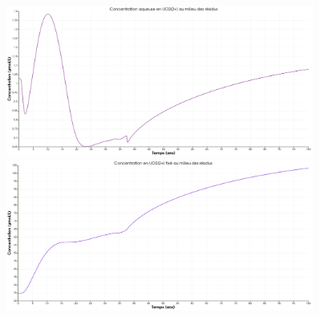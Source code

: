 \documentclass{article}
\begin{document}
\begin{figure}[H]
    \centering
    \begin{minipage}{0.5\textwidth}
        \centering
        \includegraphics[width=0.9\textwidth]{III_B_2_18.png} 
        \caption{}
        \label{fig:UO2_residus_Al}
    \end{minipage}\hfill
    \begin{minipage}{0.5\textwidth}
        \centering
        \includegraphics[width=0.9\textwidth]{III_B_2_19.png} 
        \caption{}
        \label{fig:UO2_fixe_residus_Al}
    \end{minipage}
\end{figure}
\end{document}

